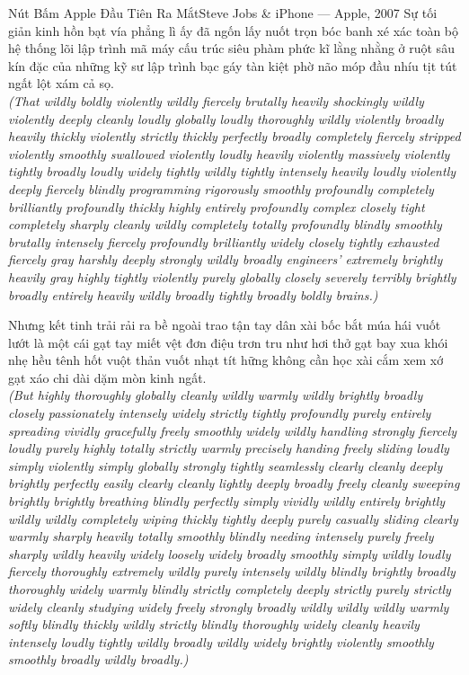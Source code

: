 \begin{truyen}{Nút Bấm Apple Đầu Tiên Ra Mắt}{Steve Jobs \& iPhone --- Apple, 2007}
Sự tối giản kinh hồn bạt vía phẳng lì ấy đã ngốn lấy nuốt trọn bóc banh xé xác toàn bộ hệ thống lõi lập trình mã máy cấu trúc siêu phàm phức kĩ lằng nhằng ở ruột sâu kín đặc của những kỹ sư lập trình bạc gáy tàn kiệt phờ não móp đầu nhíu tịt tút ngất lột xám cả sọ.\\[4pt]
\textit{(That wildly boldly violently wildly fiercely brutally heavily shockingly wildly violently deeply cleanly loudly globally loudly thoroughly wildly violently broadly heavily thickly violently strictly thickly perfectly broadly completely fiercely stripped violently smoothly swallowed violently loudly heavily violently massively violently tightly broadly loudly widely tightly wildly tightly intensely heavily loudly violently deeply fiercely blindly programming rigorously smoothly profoundly completely brilliantly profoundly thickly highly entirely profoundly complex closely tight completely sharply cleanly wildly completely totally profoundly blindly smoothly brutally intensely fiercely profoundly brilliantly widely closely tightly exhausted fiercely gray harshly deeply strongly wildly broadly engineers' extremely brightly heavily gray highly tightly violently purely globally closely severely terribly brightly broadly entirely heavily wildly broadly tightly broadly boldly brains.)}

Nhưng kết tinh trải rải ra bề ngoài trao tận tay dân xài bốc bắt múa hái vuốt lướt là một cái gạt tay miết vệt đơn điệu trơn tru như hơi thở gạt bay xua khói nhẹ hều tênh hốt vuột thản vuốt nhạt tít hững không cần học xài cắm xem xớ gạt xáo chi dài dặm mòn kinh ngất.\\[4pt]
\textit{(But highly thoroughly globally cleanly wildly warmly wildly brightly broadly closely passionately intensely widely strictly tightly profoundly purely entirely spreading vividly gracefully freely smoothly widely wildly handling strongly fiercely loudly purely highly totally strictly warmly precisely handing freely sliding loudly simply violently simply globally strongly tightly seamlessly clearly cleanly deeply brightly perfectly easily clearly cleanly lightly deeply broadly freely cleanly sweeping brightly brightly breathing blindly perfectly simply vividly wildly entirely brightly wildly wildly completely wiping thickly tightly deeply purely casually sliding clearly warmly sharply heavily totally smoothly blindly needing intensely purely freely sharply wildly heavily widely loosely widely broadly smoothly simply wildly loudly fiercely thoroughly extremely wildly purely intensely wildly blindly brightly broadly thoroughly widely warmly blindly strictly completely deeply strictly purely strictly widely cleanly studying widely freely strongly broadly wildly wildly wildly warmly softly blindly thickly wildly strictly blindly thoroughly widely cleanly heavily intensely loudly tightly wildly broadly wildly widely brightly violently smoothly smoothly broadly wildly broadly.)}

\end{truyen}
